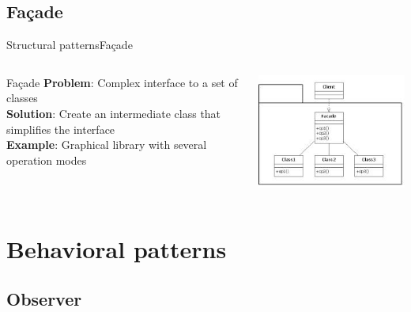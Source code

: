 \documentclass[10pt,compress]{beamer} %
\begin{document}
\subsection[Fa\c{c}ade]{Fa\c{c}ade}
\begin{frame}{Structural patterns}{Fa\c{c}ade}
    \begin{columns}
	   \begin{block}{Fa\c{c}ade}
			\textbf{Problem}: Complex interface to a set of classes\\
			\textbf{Solution}: Create an intermediate class that simplifies the interface\\
			\textbf{Example}: Graphical library with several operation modes\\
		\end{block}
			\centering\includegraphics[width=\linewidth]{figs/facade.jpeg}
	\end{columns}
\end{frame}

\section[Behavioral patterns]{Behavioral patterns}
\subsection[Observer]{Observer}
\end{document}
